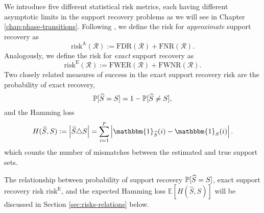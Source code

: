 We introduce five different statistical risk metrics, 
each having different asymptotic limits in the support recovery problems as we will see in 
Chapter \ref{chap:phase-transitions}.
Following \cite{arias2017distribution}, we define the risk for \emph{approximate} support recovery as
\begin{equation} \label{eq:risk-approximate}
    \mathrm{risk}^{\mathrm{A}}(\mathcal{R}) := \mathrm{FDR}(\mathcal{R}) + \mathrm{FNR}(\mathcal{R}).
\end{equation}
Analogously, we define the risk for \emph{exact} support recovery as
\begin{equation} \label{eq:risk-exact}
    \mathrm{risk}^{\mathrm{E}}(\mathcal{R}) := \mathrm{FWER}(\mathcal{R}) + \mathrm{FWNR}(\mathcal{R}).
\end{equation}
Two closely related measures of success in the exact support recovery risk are the probability of exact recovery, 
\begin{equation} \label{eq:risk-prob}
    \P[\widehat{S} = S] = 1 - \P[\widehat{S} \neq S],
\end{equation}
and the Hamming loss
\begin{equation} \label{eq:Hamming-loss}
    H(\widehat S, S) := \left|\widehat{S}\triangle S\right|
    = \sum\limits_{i=1}^p\left|\mathbbm{1}_{\widehat{S}}(i)- \mathbbm{1}_{S}(i)\right|.
\end{equation}
which counts the number of mismatches between the estimated and true support sets.

The relationship between probability of support recovery $\P[\widehat{S} = S]$, exact support recovery risk $\mathrm{risk}^{\mathrm{E}}$, and the expected Hamming loss $\mathbb{E}[H(\widehat S, S)]$ will be discussed in Section \ref{sec:risks-relations} below.

\medskip

